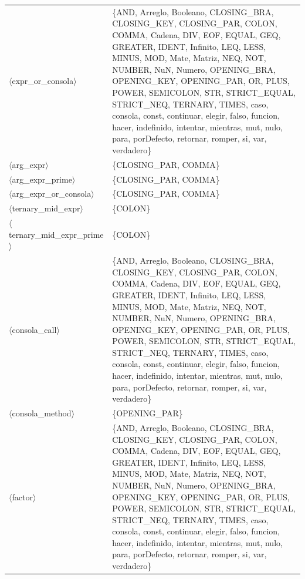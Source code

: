 \documentclass[10pt]{article}
\begin{document}
{\begin{longtable}{@{} p{3.5cm} p{13cm} @{}}
  \parbox[t]{3.3cm}{\raggedright$\langle$expr\_\allowbreak{}or\_\allowbreak{}consola$\rangle$} & \{AND, Arreglo, Booleano, CLOSING\_BRA, CLOSING\_KEY, CLOSING\_PAR, COLON, COMMA, Cadena, DIV, EOF, EQUAL, GEQ, GREATER, IDENT, Infinito, LEQ, LESS, MINUS, MOD, Mate, Matriz, NEQ, NOT, NUMBER, NuN, Numero, OPENING\_BRA, OPENING\_KEY, OPENING\_PAR, OR, PLUS, POWER, SEMICOLON, STR, STRICT\_EQUAL, STRICT\_NEQ, TERNARY, TIMES, caso, consola, const, continuar, elegir, falso, funcion, hacer, indefinido, intentar, mientras, mut, nulo, para, porDefecto, retornar, romper, si, var, verdadero\} \\
  \parbox[t]{3.3cm}{\raggedright$\langle$arg\_\allowbreak{}expr$\rangle$} & \{CLOSING\_PAR, COMMA\} \\
  \parbox[t]{3.3cm}{\raggedright$\langle$arg\_\allowbreak{}expr\_\allowbreak{}prime$\rangle$} & \{CLOSING\_PAR, COMMA\} \\
  \parbox[t]{3.3cm}{\raggedright$\langle$arg\_\allowbreak{}expr\_\allowbreak{}or\_\allowbreak{}consola$\rangle$} & \{CLOSING\_PAR, COMMA\} \\
  \parbox[t]{3.3cm}{\raggedright$\langle$ternary\_\allowbreak{}mid\_\allowbreak{}expr$\rangle$} & \{COLON\} \\
  \parbox[t]{3.3cm}{\raggedright$\langle$ternary\_\allowbreak{}mid\_\allowbreak{}expr\_\allowbreak{}prime$\rangle$} & \{COLON\} \\
  \parbox[t]{3.3cm}{\raggedright$\langle$consola\_\allowbreak{}call$\rangle$} & \{AND, Arreglo, Booleano, CLOSING\_BRA, CLOSING\_KEY, CLOSING\_PAR, COLON, COMMA, Cadena, DIV, EOF, EQUAL, GEQ, GREATER, IDENT, Infinito, LEQ, LESS, MINUS, MOD, Mate, Matriz, NEQ, NOT, NUMBER, NuN, Numero, OPENING\_BRA, OPENING\_KEY, OPENING\_PAR, OR, PLUS, POWER, SEMICOLON, STR, STRICT\_EQUAL, STRICT\_NEQ, TERNARY, TIMES, caso, consola, const, continuar, elegir, falso, funcion, hacer, indefinido, intentar, mientras, mut, nulo, para, porDefecto, retornar, romper, si, var, verdadero\} \\
  \parbox[t]{3.3cm}{\raggedright$\langle$consola\_\allowbreak{}method$\rangle$} & \{OPENING\_PAR\} \\
  \parbox[t]{3.3cm}{\raggedright$\langle$factor$\rangle$} & \{AND, Arreglo, Booleano, CLOSING\_BRA, CLOSING\_KEY, CLOSING\_PAR, COLON, COMMA, Cadena, DIV, EOF, EQUAL, GEQ, GREATER, IDENT, Infinito, LEQ, LESS, MINUS, MOD, Mate, Matriz, NEQ, NOT, NUMBER, NuN, Numero, OPENING\_BRA, OPENING\_KEY, OPENING\_PAR, OR, PLUS, POWER, SEMICOLON, STR, STRICT\_EQUAL, STRICT\_NEQ, TERNARY, TIMES, caso, consola, const, continuar, elegir, falso, funcion, hacer, indefinido, intentar, mientras, mut, nulo, para, porDefecto, retornar, romper, si, var, verdadero\} \\

\end{longtable}}
\end{document}
